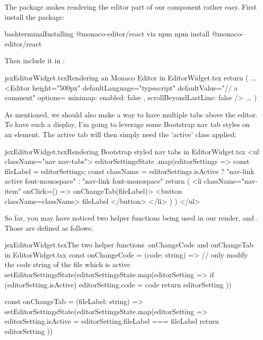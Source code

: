 \documentclass[paper=6in:9in,pagesize=pdftex,headinclude=on,footinclude=on,12pt,twoside]{scrbook}
\begin{document}

The  package makes rendering the editor part of our component rather easy. First install the package:

\begin{codeInput}{bash}{terminal}{Installing @monaco-editor/react via npm}
npm install @monaco-editor/react
\end{codeInput}

Then include it in :

\begin{codeInput}{jsx}{EditorWidget.tsx}{Rendering an Monaco Editor in EditorWidget.tsx}
return (
  ...
  <Editor
    height="500px"
    defaultLanguage="typescript"
    defaultValue={"// a comment"}
    options={{
      minimap: { enabled: false },
      scrollBeyondLastLine: false
    }}
  />
  ...
)
\end{codeInput}

As mentioned, we should also make a way to have multiple tabs above the editor. To have such a display, I'm going to leverage some Bootstrap nav tab styles on an  element. The active tab will then simply need the 'active' class applied:

\begin{codeInput}{jsx}{EditorWidget.tsx}{Rendering Bootstrap styled nav tabs in EditorWidget.tsx}
  <ul className="nav nav-tabs">
  {editorSettingsState
    .map(editorSettings => {
      const { fileLabel } = editorSettings;
      const className =
      editorSettings.isActive
          ? "nav-link active font-monospace"
          : "nav-link font-monospace"
      return (
        <li className="nav-item" onClick={() => onChangeTab(fileLabel)}>
          <button className={className}>
            {fileLabel}
          </button>
        </li>
      )
    })}
</ul>
\end{codeInput}

So far, you may have noticed two helper functions being used in our render,  and . Those are defined as follows:

\begin{codeInput}{jsx}{EditorWidget.tsx}{The two helper functions\, onChangeCode and onChangeTab in EditorWidget.tsx}
const onChangeCode = (code: string) => {
  // only modify the code string of the file which is active
  setEditorSettingsState(editorSettingsState.map(editorSetting => {
    if (editorSetting.isActive) {
      editorSetting.code = code
    }
    return editorSetting
  }))
}

const onChangeTab = (fileLabel: string) => {
  setEditorSettingsState(editorSettingsState.map(editorSetting => {
      editorSetting.isActive = editorSetting.fileLabel === fileLabel
    return editorSetting
  }))
}
\end{codeInput}
\end{document}
